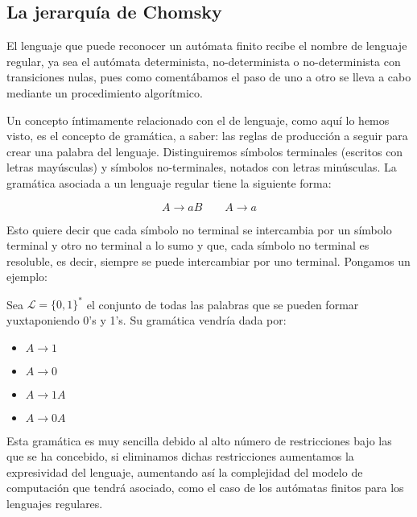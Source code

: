 \subsection{La jerarquía de Chomsky}

El lenguaje que puede reconocer un autómata finito recibe el nombre de lenguaje regular, ya sea el autómata determinista, no-determinista o no-determinista con transiciones nulas, pues como comentábamos el paso de uno a otro se lleva a cabo mediante un procedimiento algorítmico. 

\vspace{10px}

Un concepto íntimamente relacionado con el de lenguaje, como aquí lo hemos visto, es el concepto de gramática, a saber: las reglas de producción a seguir para crear una palabra del lenguaje. Distinguiremos símbolos terminales (escritos con letras mayúsculas) y símbolos no-terminales, notados con letras minúsculas. La gramática asociada a un lenguaje regular tiene la siguiente forma:


$$ A \rightarrow a B \quad \quad A \rightarrow a$$ 

Esto quiere decir que cada símbolo no terminal se intercambia por un símbolo terminal y otro no terminal a lo sumo y que, cada símbolo no terminal es resoluble, es decir, siempre se puede intercambiar por uno terminal. Pongamos un ejemplo: 

\vspace{10px}

Sea $\mathcal{L}=\{0,1\}^*$ el conjunto de todas las palabras que se pueden formar yuxtaponiendo 0's y 1's. Su gramática vendría dada por:


\begin{multicols}{2}
	\begin{itemize}
		\item $A \rightarrow 1$
		\item $A \rightarrow 0$
		\item $A \rightarrow 1A$
		\item $A \rightarrow 0A$  
	\end{itemize}
\end{multicols}


Esta gramática es muy sencilla debido al alto número de restricciones bajo las que se ha concebido, si eliminamos dichas restricciones aumentamos la expresividad del lenguaje, aumentando así la complejidad del modelo de computación que tendrá asociado, como el caso de los autómatas finitos para los lenguajes regulares.

